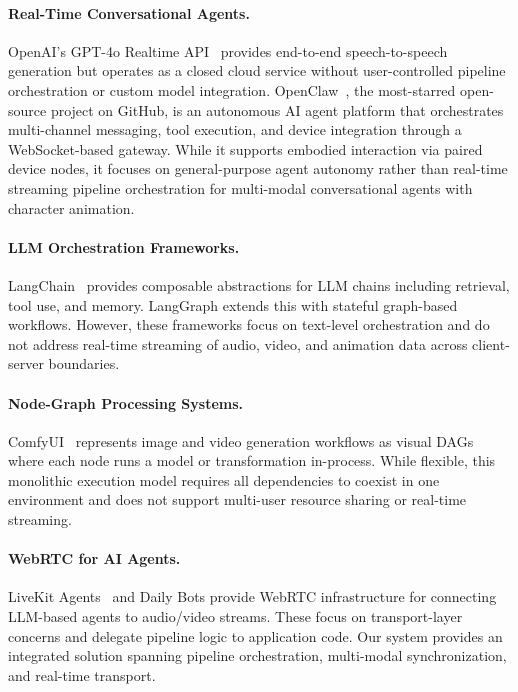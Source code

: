 \documentclass[11pt,a4paper]{article}
\begin{document}
\paragraph{Real-Time Conversational Agents.}
OpenAI's GPT-4o Realtime API~\cite{gpt4o} provides end-to-end speech-to-speech generation but operates as a closed cloud service without user-controlled pipeline orchestration or custom model integration. OpenClaw~\cite{openclaw}, the most-starred open-source project on GitHub, is an autonomous AI agent platform that orchestrates multi-channel messaging, tool execution, and device integration through a WebSocket-based gateway. While it supports embodied interaction via paired device nodes, it focuses on general-purpose agent autonomy rather than real-time streaming pipeline orchestration for multi-modal conversational agents with character animation.

\paragraph{LLM Orchestration Frameworks.}
LangChain~\cite{langchain} provides composable abstractions for LLM chains including retrieval, tool use, and memory. LangGraph extends this with stateful graph-based workflows. However, these frameworks focus on text-level orchestration and do not address real-time streaming of audio, video, and animation data across client-server boundaries.

\paragraph{Node-Graph Processing Systems.}
ComfyUI~\cite{comfyui} represents image and video generation workflows as visual DAGs where each node runs a model or transformation in-process. While flexible, this monolithic execution model requires all dependencies to coexist in one environment and does not support multi-user resource sharing or real-time streaming.

\paragraph{WebRTC for AI Agents.}
LiveKit Agents~\cite{livekit} and Daily Bots provide WebRTC infrastructure for connecting LLM-based agents to audio/video streams. These focus on transport-layer concerns and delegate pipeline logic to application code. Our system provides an integrated solution spanning pipeline orchestration, multi-modal synchronization, and real-time transport.
\end{document}
